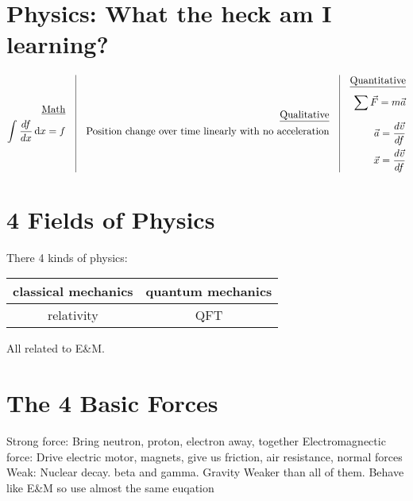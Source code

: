 \documentclass[12pt, letterpaper]{article}
\begin{document}
    \section{Physics: What the heck am I learning?}

    \begin{equation}
        \nonumber
        \begin{split}
            \underline{\text{Math}} \\
            \int_{}^{}\frac{df}{dx} \,\mathrm{d}x = f
        \end{split}
        \quad \vline \quad
        \begin{split}
            \underline{\text{Qualitative}} \\
            \text{Position change over time linearly with no acceleration}         
        \end{split}
        \quad \vline \quad
        \begin{split}
            \underline{\text{Quantitative}} \\
            \sum_{}^{}\vec{F}=m\vec{a} \\
            \vec{a} = \frac{d\vec{v}}{df} \\
            \vec{x} = \frac{d\vec{v}}{df} \\
        \end{split}
    \end{equation}

    \section{4 Fields of Physics}
    There 4 kinds of physics:
    \begin{center}
        \begin{tabular}{| c | c |}
          \hline
            classical mechanics & quantum mechanics \\ \hline
            relativity          & QFT \\
          \hline
        \end{tabular}
      \end{center}
    All related to E\&M.

    \section{The 4 Basic Forces}
    \begin{outline}[enumerate]
    \1 Strong force: 
      \2 Bring neutron, proton, electron away, together
    \1 Electromagnectic force:
      \2 Drive electric motor, magnets, give us friction, air resistance, normal forces
    \1 Weak:
      \2 Nuclear decay. beta and gamma.
    \1 Gravity
      \2 Weaker than all of them. Behave like E\&M so use almost the same euqation
    \end{outline}
\end{document}
